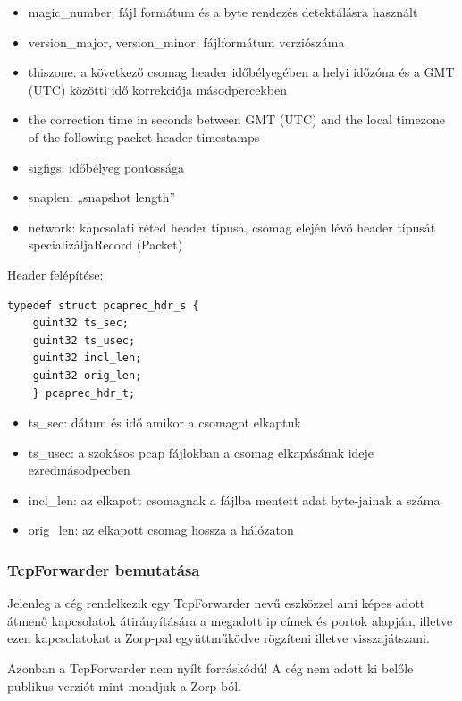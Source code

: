\documentclass[a4paper,12pt,oneside]{report}
\begin{document}
\begin{itemize}
\itemsep0em
		\item magic\_number: fájl formátum és a byte rendezés detektálásra használt
		\item version\_major, version\_minor: fájlformátum verziószáma
		\item thiszone: a következő csomag header időbélyegében a helyi időzóna és
a GMT (UTC) közötti idő korrekciója másodpercekben
		\item the correction time in seconds between GMT (UTC) and the local 
timezone of the following packet header timestamps
		\item sigfigs: időbélyeg pontossága
		\item snaplen: „snapshot length” 
		\item network: kapcsolati réted header típusa, csomag elején lévő header 
típusát specializáljaRecord (Packet) 
\end{itemize}

Header felépítése:

\begin{lstlisting}
typedef struct pcaprec_hdr_s {
	guint32 ts_sec;
	guint32 ts_usec;
	guint32 incl_len;
	guint32 orig_len;
	} pcaprec_hdr_t;
\end{lstlisting}

\begin{itemize}
\itemsep0em
	\item ts\_sec: dátum és idő amikor a csomagot elkaptuk
	\item ts\_usec: a szokásos pcap fájlokban a csomag elkapásának ideje 
ezredmásodpecben
	\item incl\_len: az elkapott csomagnak a fájlba mentett adat byte-jainak a 
száma
	\item orig\_len: az elkapott csomag hossza a hálózaton
\end{itemize}

\subsubsection{TcpForwarder bemutatása}

Jelenleg a cég rendelkezik egy TcpForwarder nevű eszközzel ami képes adott átmenő kapcsolatok átirányítására a megadott ip címek és portok alapján, illetve ezen kapcsolatokat a Zorp-pal együttműködve rögzíteni illetve visszajátszani.

Azonban a TcpForwarder nem nyílt forráskódú! A cég nem adott ki belőle publikus verziót mint mondjuk a Zorp-ból. 
\end{document}
